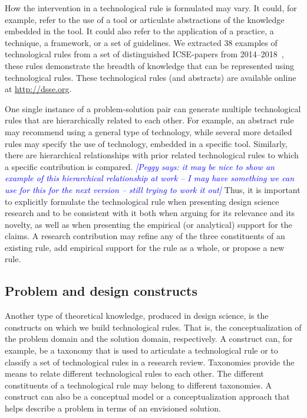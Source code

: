 \documentclass[graybox]{svmult}
\newcommand{\peggy}[1]{\textcolor{blue}{{\it [Peggy says: #1]}}}
\newcommand{\peggy}[1]{}
\begin{document}
How the intervention in a technological rule is formulated may vary. It could, for example, refer to the use of a tool or articulate abstractions of the knowledge embedded in the tool. It could also refer to the application of a practice, a technique, a framework, or a set of guidelines. We extracted 38 examples of technological rules from a set of distinguished ICSE-papers from 2014--2018~\cite{Engstrom19arxiv}, these rules demonstrate the breadth of knowledge that can be represented using technological rules. These technological rules (and abstracts) are available online at \url{http://dsse.org}.

One single instance of a problem-solution pair can generate multiple technological rules that are hierarchically related to each other. For example, an abstract rule may recommend using a general type of technology, while several more detailed rules may specify the use of technology, embedded in a specific tool.  Similarly, there are hierarchical relationships with prior related technological rules to which a specific contribution is compared.
\peggy{it may be nice to show an example of this hierarchical relationship at work -- I may have something we can use for this for the next version -- still trying to work it out}
Thus, it is important to explicitly formulate the technological rule when presenting design science research and to be consistent with it both when arguing for its relevance and its novelty, as well as when presenting the empirical (or analytical) support for the claims.  A research contribution may refine any of the three constituents of an existing rule, add empirical support for the rule as a whole, or propose a new rule.



\subsection{Problem and design constructs}
\label{sec:constructs}
Another type of theoretical knowledge, produced in design science, is the 
constructs on which we build technological rules. That is, the conceptualization of the problem domain and the solution domain, respectively.  
A construct can, for example, be a taxonomy that is used to articulate a technological rule or to classify a set of technological rules in a research review. 
Taxonomies provide the means to relate different technological rules to each other. The different constituents of a technological rule may belong to different taxonomies. A construct can also be a conceptual model or a conceptualization approach that helps describe a problem in terms of an envisioned solution.
\end{document}
